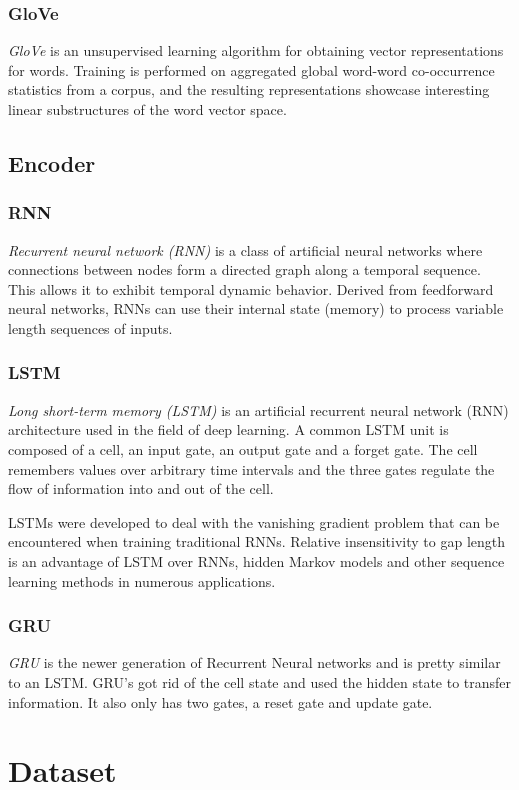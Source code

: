 \documentclass[12pt, a4paper]{article}
\begin{document}
	\subsubsection{GloVe}
	\textit{GloVe} is an unsupervised learning algorithm for obtaining vector representations for words. Training is performed on aggregated global word-word co-occurrence statistics from a corpus, and the resulting representations showcase interesting linear substructures of the word vector space.
	
	\subsection{Encoder}
	\subsubsection{RNN}
	\textit{Recurrent neural network (RNN)} is a class of artificial neural networks where connections between nodes form a directed graph along a temporal sequence. This allows it to exhibit temporal dynamic behavior. Derived from feedforward neural networks, RNNs can use their internal state (memory) to process variable length sequences of inputs.
	\subsubsection{LSTM}
	\textit{Long short-term memory (LSTM)} is an artificial recurrent neural network (RNN) architecture used in the field of deep learning.
	A common LSTM unit is composed of a cell, an input gate, an output gate and a forget gate. The cell remembers values over arbitrary time intervals and the three gates regulate the flow of information into and out of the cell.
	
	LSTMs were developed to deal with the vanishing gradient problem that can be encountered when training traditional RNNs. Relative insensitivity to gap length is an advantage of LSTM over RNNs, hidden Markov models and other sequence learning methods in numerous applications.
	\subsubsection{GRU}
	\textit{GRU} is the newer generation of Recurrent Neural networks and is pretty similar to an LSTM. GRU’s got rid of the cell state and used the hidden state to transfer information. It also only has two gates, a reset gate and update gate.
	
	\section{Dataset}
	
\end{document}
